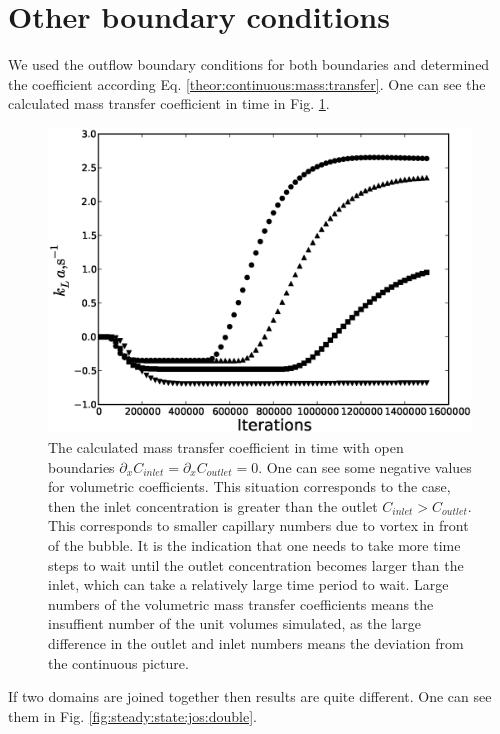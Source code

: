 \documentclass{article}
\begin{document}
\section{Other boundary conditions}
We used the outflow boundary conditions for both boundaries and determined the coefficient
according Eq. \ref{theor:continuous:mass:transfer}. One can see the calculated mass transfer
coefficient in time in Fig. \ref{fig:steady:state:jos}.
\begin{figure}[htb!]
\includegraphics[width=\textwidth]{Figures/steady_state_jos.eps}
\caption{The calculated mass transfer coefficient in time with open boundaries $\partial_x
C_{inlet}=\partial_x C_{outlet}=0$. One can see some negative values for volumetric coefficients.
This situation corresponds to the case, then the inlet concentration is greater than the outlet
$C_{inlet}>C_{outlet}$. This corresponds to smaller capillary numbers due to vortex in front of the
bubble. It is the indication that one needs to take more time steps to wait until the outlet
concentration becomes larger than the inlet, which can take a relatively large time period to
wait. Large numbers of the volumetric mass transfer coefficients means the insuffient number of
the unit volumes simulated, as the large difference in the outlet and inlet numbers means the
deviation from the continuous picture. \label{fig:steady:state:jos} }
\end{figure}
If two domains are joined together then results are quite different. One can see them in Fig.
\ref{fig:steady:state:jos:double}.
\end{document}
